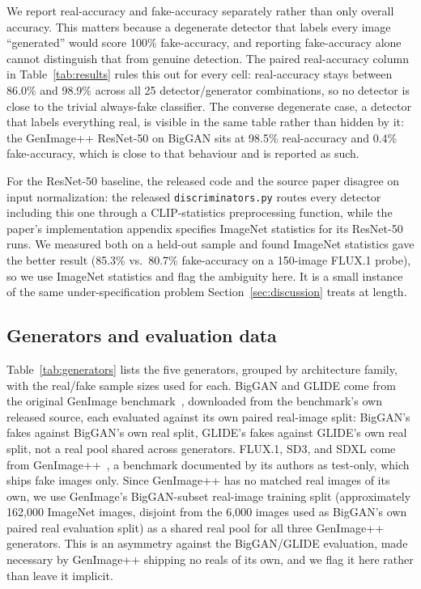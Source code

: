 \documentclass[3p,times,procedia]{elsarticle}
\begin{document}
We report real-accuracy and fake-accuracy separately rather than only
overall accuracy. This matters because a degenerate detector that labels
every image ``generated'' would score 100\% fake-accuracy, and reporting
fake-accuracy alone cannot distinguish that from genuine detection. The
paired real-accuracy column in Table~\ref{tab:results} rules this out for
every cell: real-accuracy stays between 86.0\% and 98.9\% across all 25
detector/generator combinations, so no detector is close to the trivial
always-fake classifier. The converse degenerate case, a detector that
labels everything real, is visible in the same table rather than hidden by
it: the GenImage++ ResNet-50 on BigGAN sits at 98.5\% real-accuracy and
0.4\% fake-accuracy, which is close to that behaviour and is reported as
such.

For the ResNet-50 baseline, the released code and the source paper disagree
on input normalization: the released \texttt{discriminators.py} routes every
detector including this one through a CLIP-statistics preprocessing
function, while the paper's implementation appendix specifies ImageNet
statistics for its ResNet-50 runs. We measured both on a held-out sample
and found ImageNet statistics gave the better result (85.3\% vs.\ 80.7\%
fake-accuracy on a 150-image FLUX.1 probe), so we use ImageNet statistics
and flag the ambiguity here. It is a small instance of the same
under-specification problem Section~\ref{sec:discussion} treats at length.

\subsection{Generators and evaluation data}

Table~\ref{tab:generators} lists the five generators, grouped by
architecture family, with the real/fake sample sizes used for each. BigGAN
and GLIDE come from the original GenImage benchmark~\cite{genimage2023},
downloaded from the benchmark's own released source, each evaluated against
its own paired real-image split: BigGAN's fakes against BigGAN's own real
split, GLIDE's fakes against GLIDE's own real split, not a real pool shared
across generators. FLUX.1, SD3, and SDXL come from
GenImage++~\cite{zhou2025omat}, a benchmark documented by its authors as
test-only, which ships fake images only. Since GenImage++ has no matched
real images of its own, we use GenImage's BigGAN-subset real-image training
split (approximately 162{,}000 ImageNet images, disjoint from the 6{,}000
images used as BigGAN's own paired real evaluation split) as a shared real
pool for all three GenImage++ generators. This is an asymmetry against the
BigGAN/GLIDE evaluation, made necessary by GenImage++ shipping no reals of
its own, and we flag it here rather than leave it implicit.
\end{document}
